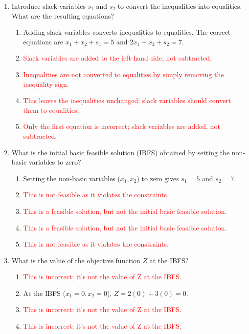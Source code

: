 \documentclass{article}%
\newcommand{\incorrect}[1]{\textcolor{red}{#1}}
\begin{document}
\begin{enumerate}
\begin{enumerate}
\item Introduce slack variables $s_1$ and $s_2$ to convert the inequalities into equalities. What are the resulting equations?%
\begin{enumerate}%
\item Adding slack variables converts inequalities to equalities.  The correct equations are $x_1 + x_2 + s_1 = 5$ and $2x_1 + x_2 + s_2 = 7$.%
\item \incorrect{Slack variables are added to the left-hand side, not subtracted.}%
\item \incorrect{Inequalities are not converted to equalities by simply removing the inequality sign.}%
\item \incorrect{This leaves the inequalities unchanged; slack variables should convert them to equalities.}%
\item \incorrect{Only the first equation is incorrect; slack variables are added, not subtracted.}%
\end{enumerate}%
\vspace{0.5em}%
\item What is the initial basic feasible solution (IBFS) obtained by setting the non-basic variables to zero?%
\begin{enumerate}%
\item Setting the non-basic variables ($x_1, x_2$) to zero gives $s_1 = 5$ and $s_2 = 7$.%
\item \incorrect{This is not feasible as it violates the constraints.}%
\item \incorrect{This is a feasible solution, but not the initial basic feasible solution.}%
\item \incorrect{This is a feasible solution, but not the initial basic feasible solution.}%
\item \incorrect{This is not feasible as it violates the constraints.}%
\end{enumerate}%
\vspace{0.5em}%
\item What is the value of the objective function $Z$ at the IBFS?%
\begin{enumerate}%
\item \incorrect{This is incorrect; it's not the value of Z at the IBFS.}%
\item At the IBFS ($x_1 = 0, x_2 = 0$), $Z = 2(0) + 3(0) = 0$.%
\item \incorrect{This is incorrect; it's not the value of Z at the IBFS.}%
\item \incorrect{This is incorrect; it's not the value of Z at the IBFS.}%

\end{enumerate}
\end{enumerate}
\end{enumerate}
\end{document}
